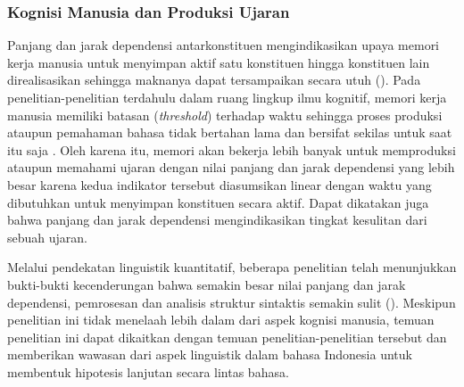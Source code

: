 \subsubsection{Kognisi Manusia dan Produksi Ujaran}
Panjang dan jarak dependensi antarkonstituen mengindikasikan upaya memori kerja manusia untuk menyimpan aktif satu konstituen hingga konstituen lain direalisasikan sehingga maknanya dapat tersampaikan secara utuh (\citealp{hudson2003psychological, liu2008dependency}). Pada penelitian-penelitian terdahulu dalam ruang lingkup ilmu kognitif, memori kerja manusia memiliki batasan (\textit{threshold}) terhadap waktu sehingga proses produksi ataupun pemahaman bahasa tidak bertahan lama dan bersifat sekilas untuk saat itu saja \citep{christiansen2016now}. Oleh karena itu, memori akan bekerja lebih banyak untuk memproduksi ataupun memahami ujaran dengan nilai panjang dan jarak dependensi yang lebih besar karena kedua indikator tersebut diasumsikan linear dengan waktu yang dibutuhkan untuk menyimpan konstituen secara aktif. Dapat dikatakan juga bahwa panjang dan jarak dependensi mengindikasikan tingkat kesulitan dari sebuah ujaran. 

Melalui pendekatan linguistik kuantitatif, beberapa penelitian telah menunjukkan bukti-bukti kecenderungan bahwa semakin besar nilai panjang dan jarak dependensi, pemrosesan dan analisis struktur sintaktis semakin sulit (\citealp{gibson1998linguistic, hiranuma1999syntactic, jiang2015effects, temperley2007minimization}). Meskipun penelitian ini tidak menelaah lebih dalam dari aspek kognisi manusia, temuan penelitian ini dapat dikaitkan dengan temuan penelitian-penelitian tersebut dan memberikan wawasan dari aspek linguistik dalam bahasa Indonesia untuk membentuk hipotesis lanjutan secara lintas bahasa.

